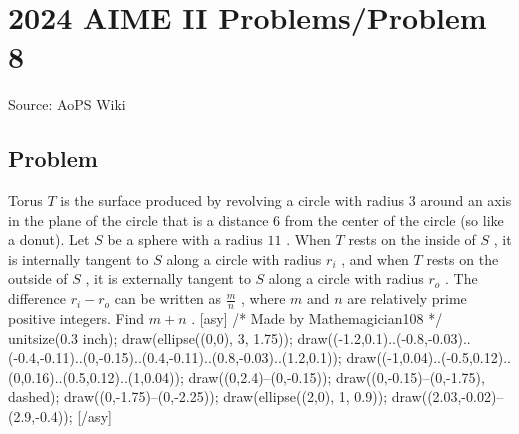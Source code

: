 \documentclass[12pt]{article}
\begin{document}
\section*{{2024 AIME II Problems/Problem 8}}
Source: AoPS Wiki

\subsection*{Problem}
Torus $T$ is the surface produced by revolving a circle with radius $3$ around an axis in the plane of the circle that is a distance $6$ from the center of the circle (so like a donut). Let $S$ be a sphere with a radius $11$ . When $T$ rests on the inside of $S$ , it is internally tangent to $S$ along a circle with radius $r_i$ , and when $T$ rests on the outside of $S$ , it is externally tangent to $S$ along a circle with radius $r_o$ . The difference $r_i-r_o$ can be written as $\tfrac{m}{n}$ , where $m$ and $n$ are relatively prime positive integers. Find $m+n$ . [asy] /* Made by Mathemagician108 */ unitsize(0.3 inch); draw(ellipse((0,0), 3, 1.75)); draw((-1.2,0.1)..(-0.8,-0.03)..(-0.4,-0.11)..(0,-0.15)..(0.4,-0.11)..(0.8,-0.03)..(1.2,0.1)); draw((-1,0.04)..(-0.5,0.12)..(0,0.16)..(0.5,0.12)..(1,0.04)); draw((0,2.4)--(0,-0.15)); draw((0,-0.15)--(0,-1.75), dashed); draw((0,-1.75)--(0,-2.25)); draw(ellipse((2,0), 1, 0.9)); draw((2.03,-0.02)--(2.9,-0.4)); [/asy]
\end{document}
